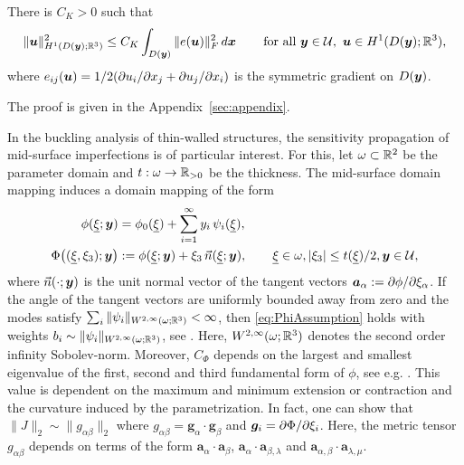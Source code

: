 \begin{lemma}\label{lemma:kornconstant}
There is $C_K>0$ such that 
  \begin{equation}\label{eq:uniformKornconstant}
    \|{\boldsymbol{u}}\|_{H^1(D({\boldsymbol{y}});\mathbb{R}^3)}^2\le C_K\int_{D({\boldsymbol{y}})}\|e({\boldsymbol{u}})\|_F^2\mathop{d\boldsymbol{x}}
    \qquad\text{for all }{\boldsymbol{y}}\in\mathcal{U},\ {\boldsymbol{u}}\in H^1(D({\boldsymbol{y}});\mathbb{R}^3),
  \end{equation}
  where $e_{ij}({\boldsymbol{u}}) = 1/2 ( \partial u_{i}/\partial x_j + \partial u_{j}/\partial x_i)$ is the symmetric gradient on $D({\boldsymbol{y}})$.
  \end{lemma}
  The proof is given in the Appendix~\ref{sec:appendix}.
\begin{example}
In the buckling analysis of thin-walled structures, the sensitivity propagation of mid-surface imperfections is of particular interest. For this, let $\omega \subset \mathbb{R}^2 $ be the parameter domain and $ t: \omega \to \mathbb{R}_{>0}$ be the thickness. The mid-surface domain mapping induces a domain mapping of the form
  \begin{align*}
    \phi(\underline{\xi};{\boldsymbol{y}})&=\phi_0(\underline{\xi})+\sum_{i=1}^\infty y_i\,\psi_i(\underline{\xi}),
    \\
    \Phi\big((\underline{\xi},\xi_3);{\boldsymbol{y}}\big)&:=\phi(\underline{\xi};{\boldsymbol{y}})+\xi_3\,\vec n(\underline{\xi};{\boldsymbol{y}}), \qquad  \underline{\xi} \in \omega, \vert \xi_3 \vert \leq t(\underline{\xi})/2,   {\boldsymbol{y}} \in \mathcal{U},
  \end{align*}
  where $\vec n(\cdot;{\boldsymbol{y}})$ is the unit normal vector of the tangent vectors $ \boldsymbol{a}_{\alpha} :=\partial\phi/\partial \xi_\alpha$. 
  If the angle of the tangent vectors are uniformly bounded away from zero and the modes satisfy $\sum_i\|\psi_i\|_{W^{2,\infty}(\omega;\mathbb{R}^3)}<\infty$, then
  \eqref{eq:PhiAssumption} holds with weights $b_i\sim\|\psi_i\|_{W^{2,\infty}(\omega;\mathbb{R}^3)}$,
  see \cite{GIANI2025118081}. Here, $W^{2,\infty}(\omega;\mathbb{R}^3)$ denotes the second order infinity Sobolev-norm. Moreover, $C_\Phi$ depends on the largest and smallest eigenvalue of the first, second and third fundamental form of $\phi$, see e.g. \cite[Chapter 2]{ChapelleBathe2011}. This value is dependent on the maximum and minimum extension or contraction and the curvature induced by the parametrization. In fact, one can show that $ \| J \|_2 \sim  \| g_{\alpha \beta } \|_2   $  where $g_{\alpha \beta } = \boldsymbol{g}_\alpha  \cdot \boldsymbol{g}_\beta $ and $\boldsymbol{g}_i = \partial\Phi / \partial \xi_i$. Here, the metric tensor $g_{\alpha\beta}$ depends on terms of the form $\boldsymbol{a}_{\alpha} \cdot \boldsymbol{a}_{\beta}$, $ \boldsymbol{a}_{\alpha} \cdot \boldsymbol{a}_{\beta,\lambda} $ and $\boldsymbol{a}_{\alpha,\beta} \cdot \boldsymbol{a}_{\lambda,\mu}$.

\end{example}
